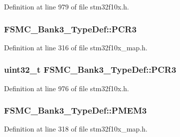 Definition at line 979 of file stm32f10x.\+h.

\subsubsection[{\texorpdfstring{P\+C\+R3}{PCR3}}]{ F\+S\+M\+C\+\_\+\+Bank3\+\_\+\+Type\+Def\+::\+P\+C\+R3}\hypertarget{struct_f_s_m_c___bank3___type_def_aead80d12f624d3ef42c9714fd20009ed}{}\label{struct_f_s_m_c___bank3___type_def_aead80d12f624d3ef42c9714fd20009ed}


Definition at line 316 of file stm32f10x\+\_\+map.\+h.

\subsubsection[{\texorpdfstring{P\+C\+R3}{PCR3}}]{ {\bf uint32\+\_\+t} F\+S\+M\+C\+\_\+\+Bank3\+\_\+\+Type\+Def\+::\+P\+C\+R3}\hypertarget{struct_f_s_m_c___bank3___type_def_a1f772e1028641cab7b923bf02115b919}{}\label{struct_f_s_m_c___bank3___type_def_a1f772e1028641cab7b923bf02115b919}


Definition at line 976 of file stm32f10x.\+h.

\subsubsection[{\texorpdfstring{P\+M\+E\+M3}{PMEM3}}]{ F\+S\+M\+C\+\_\+\+Bank3\+\_\+\+Type\+Def\+::\+P\+M\+E\+M3}\hypertarget{struct_f_s_m_c___bank3___type_def_ac2c7b998daa8856261945dec8ed66f59}{}\label{struct_f_s_m_c___bank3___type_def_ac2c7b998daa8856261945dec8ed66f59}


Definition at line 318 of file stm32f10x\+\_\+map.\+h.

